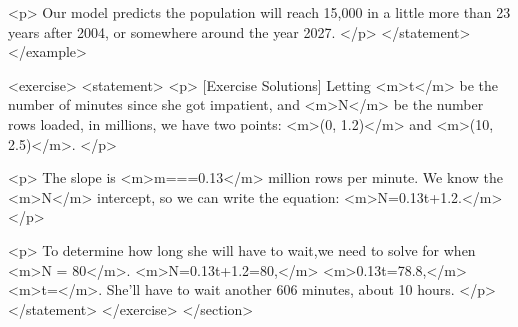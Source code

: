             <p>
                Our model predicts the population will reach 15,000 in a little more than 23 years after 2004, or somewhere around the year 2027.
            </p>
        </statement>
    </example>

    <exercise>
        <statement>
            <p>
                [Exercise Solutions] Letting <m>t</m> be the number of minutes since she got impatient, and <m>N</m> be the number rows loaded, in millions, we have two points: <m>(0, 1.2)</m> and <m>(10, 2.5)</m>.
            </p>

            <p>
                The slope is <m>m===0.13</m> million rows per minute.
                We know the <m>N</m> intercept, so we can write the equation: <m>N=0.13t+1.2.</m>
            </p>

            <p>
                To determine how long she will have to wait,we need to solve for when <m>N = 80</m>.
                <m>N=0.13t+1.2=80,</m> <m>0.13t=78.8,</m> <m>t=</m>.
                She’ll have to wait another 606 minutes, about 10 hours.
            </p>
        </statement>
    </exercise>
</section>